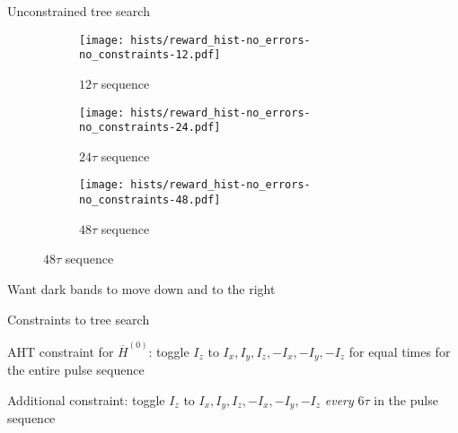 \documentclass{beamer}
\begin{document}
\begin{frame}{Unconstrained tree search}
%

\begin{figure}[H]
    \centering
    \begin{subfigure}{.49\textwidth}
        \centering
        \texttt{[image: hists/reward\_hist-no\_errors-no\_constraints-12.pdf]}
        \caption{$12\tau$ sequence}
        \label{fig:reward_hist-no_errors-no_constraints-12}
    \end{subfigure}
    \begin{subfigure}{.49\textwidth}
        \centering
        \texttt{[image: hists/reward\_hist-no\_errors-no\_constraints-24.pdf]}
        \caption{$24\tau$ sequence}
        \label{fig:reward_hist-no_errors-no_constraints-24}
    \end{subfigure}
    \begin{subfigure}{.49\textwidth}
        \centering
        \texttt{[image: hists/reward\_hist-no\_errors-no\_constraints-48.pdf]}
        \caption{$48\tau$ sequence}
        \label{fig:reward_hist-no_errors-no_constraints-48}
    \end{subfigure}
\end{figure}

Want dark bands to move down and to the right


\end{frame}


\begin{frame}{Constraints to tree search}
%

AHT constraint for $\overline{H}^{(0)}$: toggle $I_z$ to $I_x, I_y, I_z, -I_x, -I_y, -I_z$ for equal times for the entire pulse sequence

\begin{figure}
\centering
\scalebox{.7}{

}
\end{figure}

Additional constraint: toggle $I_z$ to $I_x, I_y, I_z, -I_x, -I_y, -I_z$ \emph{every} $6\tau$ in the pulse sequence

\end{frame}
\end{document}
